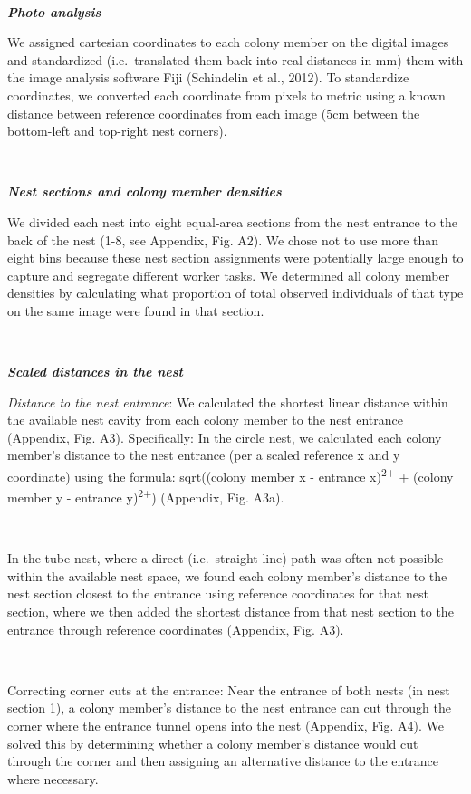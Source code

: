 \documentclass[3p]{elsarticle} %
\begin{document}
~

\textbf{\emph{Photo analysis}}

We assigned cartesian coordinates to each colony member on the digital
images and standardized (i.e.~translated them back into real distances
in mm) them with the image analysis software Fiji (Schindelin et al.,
2012). To standardize coordinates, we converted each coordinate from
pixels to metric using a known distance between reference coordinates
from each image (5cm between the bottom-left and top-right nest
corners).

~

\textbf{\emph{Nest sections and colony member densities}}

We divided each nest into eight equal-area sections from the nest
entrance to the back of the nest (1-8, see Appendix, Fig. A2). We chose
not to use more than eight bins because these nest section assignments
were potentially large enough to capture and segregate different worker
tasks. We determined all colony member densities by calculating what
proportion of total observed individuals of that type on the same image
were found in that section.

~

\textbf{\emph{Scaled distances in the nest}}

\emph{Distance to the nest entrance}: We calculated the shortest linear
distance within the available nest cavity from each colony member to the
nest entrance (Appendix, Fig. A3). Specifically: In the circle nest, we
calculated each colony member's distance to the nest entrance (per a
scaled reference x and y coordinate) using the formula: sqrt((colony
member x - entrance x)\textsuperscript{2+} + (colony member y - entrance
y)\textsuperscript{2+}) (Appendix, Fig. A3a).

~

In the tube nest, where a direct (i.e.~straight-line) path was often not
possible within the available nest space, we found each colony member's
distance to the nest section closest to the entrance using reference
coordinates for that nest section, where we then added the shortest
distance from that nest section to the entrance through reference
coordinates (Appendix, Fig. A3).

~

Correcting corner cuts at the entrance: Near the entrance of both nests
(in nest section 1), a colony member's distance to the nest entrance can
cut through the corner where the entrance tunnel opens into the nest
(Appendix, Fig. A4). We solved this by determining whether a colony
member's distance would cut through the corner and then assigning an
alternative distance to the entrance where necessary.
\end{document}
